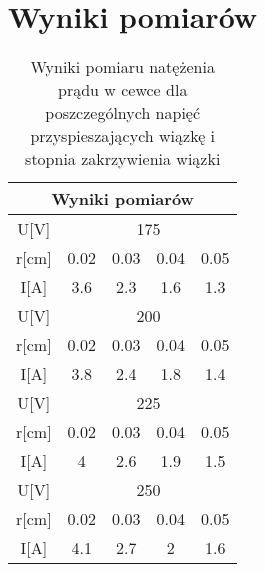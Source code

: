 \documentclass{article}
\begin{document}

 


\section{Wyniki pomiarów}

\begin{table}[htbp]
\centering
\begin{tabular}{|c|c|c|c|c|}
\hline
\multicolumn{5}{|c|}{Wyniki pomiarów}  \\ \hline
U[V] & \multicolumn{4}{|c|}{175} \\ \hline
r[cm] & 0.02 & 0.03 & 0.04 & 0.05 \\ \hline
I[A] & 3.6 & 2.3 & 1.6 & 1.3 \\ \hline

U[V] & \multicolumn{4}{|c|}{200} \\ \hline
r[cm] & 0.02 & 0.03 & 0.04 & 0.05 \\ \hline
I[A] & 3.8 & 2.4 & 1.8 & 1.4 \\ \hline 

U[V] & \multicolumn{4}{|c|}{225} \\ \hline
r[cm] & 0.02 & 0.03 & 0.04 & 0.05 \\ \hline
I[A] & 4 & 2.6 & 1.9 & 1.5 \\ \hline

U[V] & \multicolumn{4}{|c|}{250} \\ \hline
r[cm] & 0.02 & 0.03 & 0.04 & 0.05 \\ \hline
I[A] & 4.1 & 2.7 & 2 & 1.6 \\ \hline
\end{tabular}
\caption{Wyniki pomiaru natężenia prądu w cewce dla poszczególnych napięć przyspieszających wiązkę i stopnia zakrzywienia wiązki}
\label{}
\end{table}
\end{document}
